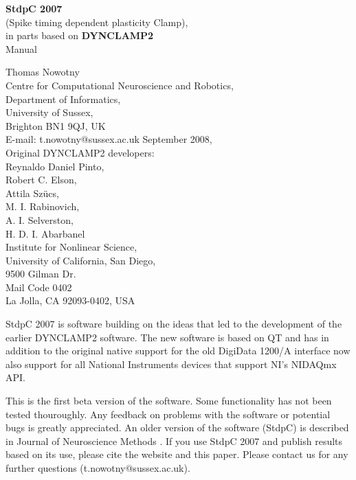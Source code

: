 \documentclass{article}
\begin{document}
\begin{titlepage}
  \begin{center}
  {{\bf \Large 
    StdpC 2007 }\\[0.3cm]
    \large (Spike timing dependent plasticity Clamp)}, \\[1cm]
  {\large 
    in parts based on {\bf DYNCLAMP2} \cite{Pinto2001} 
  } \\[2cm]
  {\sc \Large Manual }
  \end{center}
\vspace*{5cm}

\noindent
{\large Thomas Nowotny} \\[0.5cm]
Centre for Computational Neuroscience and Robotics, \\
Department of Informatics, \\
University of Sussex, \\
Brighton BN1 9QJ, UK \\
E-mail: t.nowotny@sussex.ac.uk
September 2008, \\[1cm]
Original DYNCLAMP2 developers: \\[0.2cm]
Reynaldo Daniel Pinto, \\
Robert C. Elson, \\
Attila Sz\"ucs, \\
M. I. Rabinovich, \\
A. I. Selverston,  \\
H. D. I. Abarbanel \\[0.5cm]
Institute for Nonlinear Science, \\
University of California, San Diego, \\
9500 Gilman Dr. \\ Mail Code 0402 \\
La Jolla, CA 92093-0402, USA \\

\end{titlepage}

StdpC 2007 is software building on the ideas that led
to the development of the earlier DYNCLAMP2
software. The new software is based on QT and has in addition to the
original native support for the old DigiData 1200/A interface now also
support for all National Instruments devices that support NI's NIDAQmx
API.
 
This is the first beta version of the software. Some functionality has
not been tested thouroughly. Any feedback on problems with the
software or potential bugs is greatly appreciated.  An older version
of the software (StdpC) is described in Journal of Neuroscience
Methods \cite{Nowotny2006}. If you use StdpC 2007 and publish results
based on its use, please cite the website and this paper. Please
contact us for any further questions (t.nowotny@sussex.ac.uk).
\end{document}
